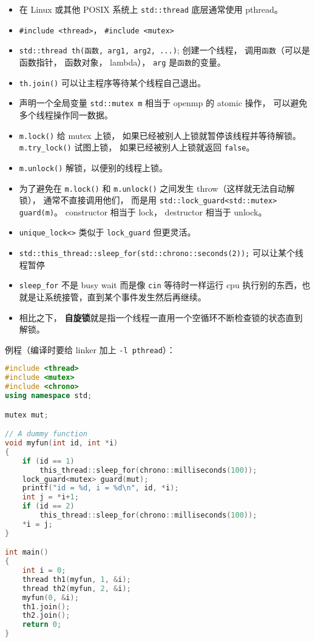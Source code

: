 
\begin{itemize}
\item 在 Linux 或其他 POSIX 系统上 \verb|std::thread| 底层通常使用 pthread。
\item \verb|#include <thread>|， \verb|#include <mutex>|
\item \verb|std::thread th(函数, arg1, arg2, ...)|; 创建一个线程， 调用\verb|函数|（可以是函数指针， 函数对象， lambda）， \verb|arg| 是\verb|函数|的变量。
\item \verb|th.join()| 可以让主程序等待某个线程自己退出。
\item 声明一个全局变量 \verb|std::mutex m| 相当于 openmp 的 atomic 操作， 可以避免多个线程操作同一数据。
\item \verb|m.lock()| 给 mutex 上锁， 如果已经被别人上锁就暂停该线程并等待解锁。 \verb|m.try_lock()| 试图上锁， 如果已经被别人上锁就返回 \verb|false|。
\item \verb|m.unlock()| 解锁，以便别的线程上锁。
\item 为了避免在 \verb|m.lock()| 和 \verb|m.unlock()| 之间发生 throw（这样就无法自动解锁）， 通常不直接调用他们， 而是用 \verb|std::lock_guard<std::mutex> guard(m)|。 constructor 相当于 lock， destructor 相当于 unlock。
\item \verb`unique_lock<>` 类似于 \verb`lock_guard` 但更灵活。
\item \verb|std::this_thread::sleep_for(std::chrono::seconds(2));| 可以让某个线程暂停
\item \verb`sleep_for` 不是 busy wait 而是像 \verb`cin` 等待时一样运行 cpu 执行别的东西，也就是让系统接管，直到某个事件发生然后再继续。
\item 相比之下， \textbf{自旋锁}就是指一个线程一直用一个空循环不断检查锁的状态直到解锁。
\end{itemize}

例程（编译时要给 linker 加上 \verb|-l pthread|）：
\begin{lstlisting}[language=cpp]
#include <thread>
#include <mutex>
#include <chrono>
using namespace std;

mutex mut;

// A dummy function
void myfun(int id, int *i)
{
    if (id == 1)
        this_thread::sleep_for(chrono::milliseconds(100));
    lock_guard<mutex> guard(mut);
    printf("id = %d, i = %d\n", id, *i);
    int j = *i+1;
    if (id == 2)
        this_thread::sleep_for(chrono::milliseconds(100));
    *i = j;
}

int main()
{
    int i = 0;
    thread th1(myfun, 1, &i);
    thread th2(myfun, 2, &i);
    myfun(0, &i);
    th1.join();
    th2.join();
    return 0;
}
\end{lstlisting}

